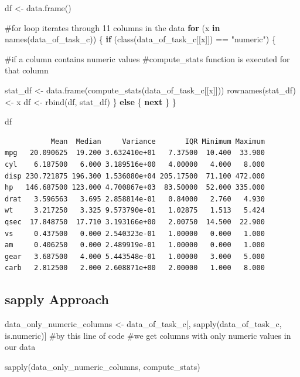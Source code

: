 \documentclass[
  letterpaper,
  DIV=11,
  numbers=noendperiod]{scrartcl}
\newenvironment{Shaded}{\begin{snugshade}}{\end{snugshade}}
\newcommand{\CommentTok}[1]{\textcolor[rgb]{0.37,0.37,0.37}{#1}}
\newcommand{\ControlFlowTok}[1]{\textcolor[rgb]{0.00,0.23,0.31}{\textbf{#1}}}
\newcommand{\FunctionTok}[1]{\textcolor[rgb]{0.28,0.35,0.67}{#1}}
\newcommand{\NormalTok}[1]{\textcolor[rgb]{0.00,0.23,0.31}{#1}}
\newcommand{\OtherTok}[1]{\textcolor[rgb]{0.00,0.23,0.31}{#1}}
\newcommand{\SpecialCharTok}[1]{\textcolor[rgb]{0.37,0.37,0.37}{#1}}
\newcommand{\StringTok}[1]{\textcolor[rgb]{0.13,0.47,0.30}{#1}}
\begin{document}
\begin{Shaded}
\begin{Highlighting}[]
\NormalTok{df }\OtherTok{\textless{}{-}} \FunctionTok{data.frame}\NormalTok{()}


\CommentTok{\#for loop iterates through 11 columns in the data}
\ControlFlowTok{for}\NormalTok{ (x }\ControlFlowTok{in} \FunctionTok{names}\NormalTok{(data\_of\_task\_c)) \{}
  \ControlFlowTok{if}\NormalTok{ (}\FunctionTok{class}\NormalTok{(data\_of\_task\_c[[x]]) }\SpecialCharTok{==} \StringTok{"numeric"}\NormalTok{) \{}
    
    \CommentTok{\#if a column contains numeric values}
    \CommentTok{\#compute\_stats function is executed for that column}
    
\NormalTok{    stat\_df }\OtherTok{\textless{}{-}} \FunctionTok{data.frame}\NormalTok{(}\FunctionTok{compute\_stats}\NormalTok{(data\_of\_task\_c[[x]]))}
    \FunctionTok{rownames}\NormalTok{(stat\_df) }\OtherTok{\textless{}{-}}\NormalTok{ x}
\NormalTok{    df }\OtherTok{\textless{}{-}} \FunctionTok{rbind}\NormalTok{(df, stat\_df)}
\NormalTok{  \}}
  \ControlFlowTok{else}\NormalTok{ \{}
    \ControlFlowTok{next}
\NormalTok{  \}}
\NormalTok{\}}

\NormalTok{df}
\end{Highlighting}
\end{Shaded}

\begin{verbatim}
           Mean  Median     Variance       IQR Minimum Maximum
mpg   20.090625  19.200 3.632410e+01   7.37500  10.400  33.900
cyl    6.187500   6.000 3.189516e+00   4.00000   4.000   8.000
disp 230.721875 196.300 1.536080e+04 205.17500  71.100 472.000
hp   146.687500 123.000 4.700867e+03  83.50000  52.000 335.000
drat   3.596563   3.695 2.858814e-01   0.84000   2.760   4.930
wt     3.217250   3.325 9.573790e-01   1.02875   1.513   5.424
qsec  17.848750  17.710 3.193166e+00   2.00750  14.500  22.900
vs     0.437500   0.000 2.540323e-01   1.00000   0.000   1.000
am     0.406250   0.000 2.489919e-01   1.00000   0.000   1.000
gear   3.687500   4.000 5.443548e-01   1.00000   3.000   5.000
carb   2.812500   2.000 2.608871e+00   2.00000   1.000   8.000
\end{verbatim}

\subsection{sapply Approach}\label{sapply-approach}

\begin{Shaded}
\begin{Highlighting}[]
\NormalTok{data\_only\_numeric\_columns }\OtherTok{\textless{}{-}}\NormalTok{ data\_of\_task\_c[, }\FunctionTok{sapply}\NormalTok{(data\_of\_task\_c, is.numeric)] }
\CommentTok{\#by this line of code}
\CommentTok{\#we get columns with only numeric values in our data}

\FunctionTok{sapply}\NormalTok{(data\_only\_numeric\_columns, compute\_stats)}
\end{Highlighting}
\end{Shaded}
\end{document}
